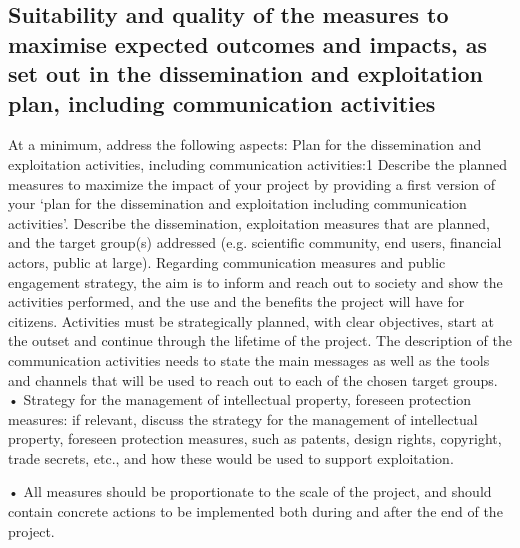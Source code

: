 \subsection{Suitability and quality of the measures to maximise expected outcomes and impacts, as set out in the dissemination and exploitation plan, including communication activities}
\label{sec:suitability}

At a minimum, address the following aspects:
Plan for the dissemination and exploitation activities, including communication activities:1 Describe the planned measures to maximize the impact of your project by providing a first version of your ‘plan for the dissemination and exploitation including communication activities’. Describe the dissemination, exploitation measures that are planned, and the target group(s) addressed (e.g. scientific community, end users, financial actors, public at large). Regarding communication measures and public engagement strategy, the aim is to inform and reach out to society and show the
activities performed, and the use and the benefits the project will have for citizens. Activities must be strategically planned, with clear objectives, start at the outset and continue through the lifetime of the project. The description of the communication activities needs to state the main messages as well as the tools and channels that will be used to reach out to each of the chosen target groups.
    • Strategy for the management of intellectual property, foreseen protection measures: if relevant, discuss the strategy for the management of intellectual property, foreseen protection measures, such as patents, design rights, copyright, trade secrets, etc., and how these would be used to support exploitation.

    • All measures should be proportionate to the scale of the project, and should contain concrete actions to be implemented both during and after the end of the project.



%
%
%
%
